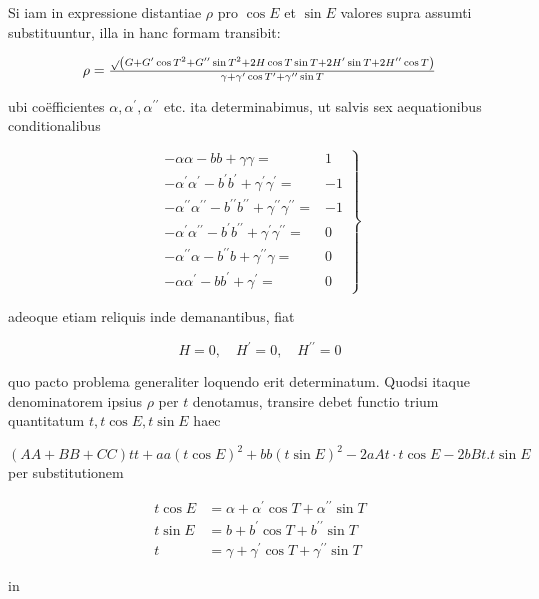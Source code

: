 \documentclass[twoside,12pt, showframe]{memoir}
\let\oldfrac\frac
\def\frac#1#2{\mathchoice{\tfrac{#1}{#2}}{\oldfrac{#1}{#2}}{\genfrac{}{}{}{2}{#1}{#2\mathstrut}}{\genfrac{}{}{}{3}{#1}{#2\mathstrut}}}
\begin{document}
Si iam in expressione distantiae \(\rho\) pro \(\cos E\) et \(\sin E\) valores supra assumti substituuntur, illa in hanc formam transibit:

\[
\rho=\frac{\sqrt{ }\left(G+G^{\prime} \cos T^{2}+G^{\prime \prime} \sin T^{2}+2 H \cos T \sin T+2 H^{\prime} \sin T+2 H^{\prime \prime} \cos T\right)}{\gamma+\gamma^{\prime} \cos T^{\prime}+\gamma^{\prime \prime} \sin T}
\]

ubi coëfficientes \(\alpha, \alpha^{\prime}, \alpha^{\prime \prime}\) etc. ita determinabimus, ut salvis sex aequationibus conditionalibus

\[
\left.\begin{array}{lr}
-\alpha \alpha-b b+\gamma \gamma= & 1 \\
-\alpha^{\prime} \alpha^{\prime}-b^{\prime} b^{\prime}+\gamma^{\prime} \gamma^{\prime}= & -1 \\
-\alpha^{\prime \prime} \alpha^{\prime \prime}-b^{\prime \prime} b^{\prime \prime}+\gamma^{\prime \prime} \gamma^{\prime \prime}= & -1 \\
-\alpha^{\prime} \alpha^{\prime \prime}-b^{\prime} b^{\prime \prime}+\gamma^{\prime} \gamma^{\prime \prime}= & 0 \\
-\alpha^{\prime \prime} \alpha-b^{\prime \prime} b+\gamma^{\prime \prime} \gamma= & 0 \\
-\alpha \alpha^{\prime}-b b^{\prime}+\gamma^{\prime}= & 0
\end{array}\right\}
\]

adeoque etiam reliquis inde demanantibus, fiat

\[
H=0, \quad H^{\prime}=0, \quad H^{\prime \prime}=0
\]

quo pacto problema generaliter loquendo erit determinatum. Quodsi itaque denominatorem ipsius \(\rho\) per \(t\) denotamus, transire debet functio trium quantitatum \(t, t \cos E, t \sin E\) haec

\((A A+B B+C C) t t+a a(t \cos E)^{2}+b b(t \sin E)^{2}-2 a A t \cdot t \cos E-2 b B t . t \sin E\) per substitutionem

\[
\begin{aligned}
t \cos E & =\alpha+\alpha^{\prime} \cos T+\alpha^{\prime \prime} \sin T \\
t \sin E & =b+b^{\prime} \cos T+b^{\prime \prime} \sin T \\
t & =\gamma+\gamma^{\prime} \cos T+\gamma^{\prime \prime} \sin T
\end{aligned}
\]

in
\end{document}
